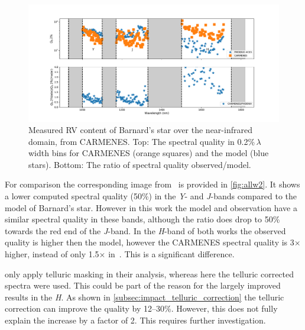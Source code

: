 \begin{figure}
    \centering
    \includegraphics[width=0.8\linewidth]{figures/information-content/Carmenes/quality_comparision_to_model}
    \caption[Barnard's star spectral quality compared to CARMENES.]{Measured RV content of Barnard's star over the near-infrared domain, from CARMENES.
    Top: The spectral quality in 0.2\%\,\(\lambda\) width bins for CARMENES (orange squares) and the model (blue stars).
    Bottom: The ratio of spectral quality observed/model.}
    \label{fig:qualitycomparisiontomodel}
\end{figure}

For comparison the corresponding image from~\citet{artigau_optical_2018} is provided in \cref{fig:allw2}.
It shows a lower computed spectral quality (50\%) in the \emph{Y}- and \emph{J}-bands compared to the model of Barnard's star.
However in this work the model and observation have a similar spectral quality in these bands, although the ratio does drop to 50\% towards the red end of the \emph{J}-band.
In the \emph{H}-band of both works the observed quality is higher then the model, however the CARMENES spectral quality is 3\(\times\) higher, instead of only 1.5\(\times\) in~\citet{artigau_optical_2018}.
This is a significant difference.

\citet{artigau_optical_2018} only apply telluric masking in their analysis, whereas here the telluric corrected spectra were used.
This could be part of the reason for the largely improved results in the \emph{H}.
As shown in \cref{subsec:impact_telluric_correction} the telluric correction can improve the quality by 12--30\%.
However, this does not fully explain the increase by a factor of 2.
This requires further investigation.


